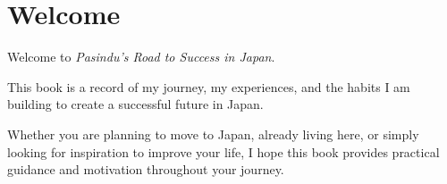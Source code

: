 \section{Welcome}

Welcome to \textit{Pasindu's Road to Success in Japan}.

This book is a record of my journey, my experiences, and the habits I am building to create a successful future in Japan.

Whether you are planning to move to Japan, already living here, or simply looking for inspiration to improve your life, I hope this book provides practical guidance and motivation throughout your journey.